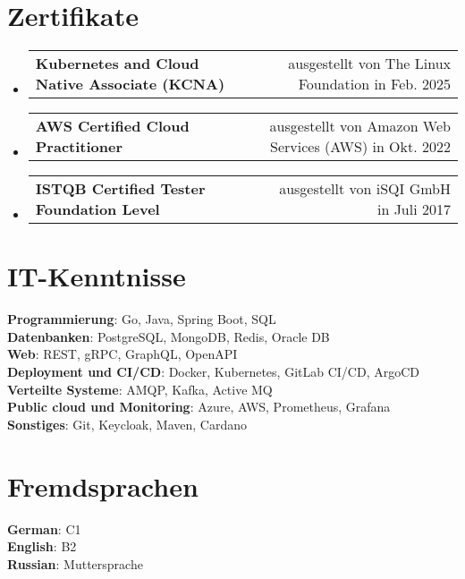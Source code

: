 \documentclass[letterpaper,11pt]{article}
\makeatletter
\newcommand{\resumeCertifications}[2]{
  \vspace{-2pt}\item
    \begin{tabular*}{0.97\textwidth}[t]{l@{\extracolsep{\fill}}r}
      \small\textbf{#1} & \small#2 \\
    \end{tabular*}\vspace{-20pt}
}
\newcommand{\resumeSubHeadingListStart}{\begin{itemize}[leftmargin=0.15in, label={}]}
\newcommand{\resumeSubHeadingListEnd}{\end{itemize}}
\makeatother
\begin{document}
\section{Zertifikate}
\resumeSubHeadingListStart
  \resumeCertifications
    {Kubernetes and Cloud Native Associate (KCNA)}{ausgestellt von The Linux Foundation in Feb. 2025}
  \resumeCertifications
    {AWS Certified Cloud Practitioner}{ausgestellt von Amazon Web Services (AWS) in Okt. 2022}
  \resumeCertifications
    {ISTQB Certified Tester Foundation Level}{ausgestellt von iSQI GmbH in Juli 2017}
\resumeSubHeadingListEnd



\begin{minipage}[t]{0.68\textwidth}\vspace{16pt}
    \section{IT-Kenntnisse}
    \begin{itemize}[leftmargin=0.15in, label={}]\vspace{-5pt}
        \small{\item{
            \textbf{Programmierung}{: Go, Java, Spring Boot, SQL} \\
            \textbf{Datenbanken}{: PostgreSQL, MongoDB, Redis, Oracle DB}\\
            \textbf{Web}{: REST, gRPC, GraphQL, OpenAPI}\\
            \textbf{Deployment und CI/CD}{: Docker, Kubernetes, GitLab CI/CD, ArgoCD}\\
            \textbf{Verteilte Systeme}{: AMQP, Kafka, Active MQ}\\
            \textbf{Public cloud und Monitoring}{: Azure, AWS, Prometheus, Grafana} \\
            \textbf{Sonstiges}{: Git, Keycloak, Maven, Cardano} \\
        }}
    \end{itemize}
\end{minipage}
\hfill
\begin{minipage}[t]{0.28\textwidth}\vspace{16pt}
    \section{Fremdsprachen}
    \begin{itemize}[leftmargin=0.15in, label={}]\vspace{-5pt}
        \small{\item{
            \textbf{German}{: C1} \\
            \textbf{English}{: B2} \\
            \textbf{Russian}{: Muttersprache}
        }}
    \end{itemize}
\end{minipage}

\end{document}
